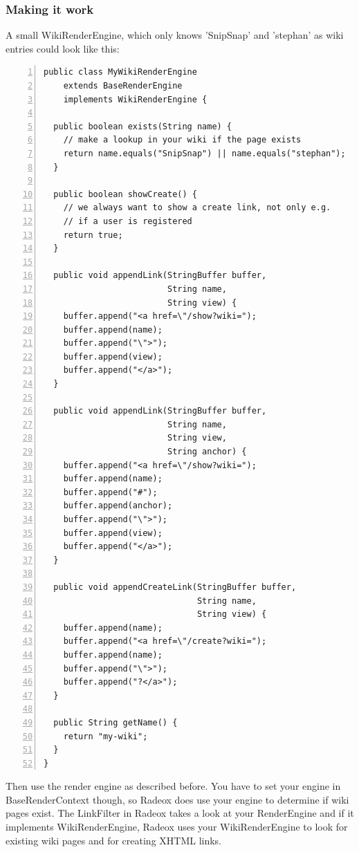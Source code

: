 \documentclass[a4paper,pdftex]{article}
\begin{document}
\subsubsection{Making it work}

A small WikiRenderEngine, which only knows 'SnipSnap' and 'stephan' as wiki entries could look like this:

\begin{Verbatim}[gobble=0,frame=single,numbers=left,fontsize=\small]
public class MyWikiRenderEngine
    extends BaseRenderEngine
    implements WikiRenderEngine {

  public boolean exists(String name) {
    // make a lookup in your wiki if the page exists
    return name.equals("SnipSnap") || name.equals("stephan");
  }

  public boolean showCreate() {
    // we always want to show a create link, not only e.g.
    // if a user is registered
    return true;
  }

  public void appendLink(StringBuffer buffer,
                         String name,
                         String view) {
    buffer.append("<a href=\"/show?wiki=");
    buffer.append(name);
    buffer.append("\">");
    buffer.append(view);
    buffer.append("</a>");
  }

  public void appendLink(StringBuffer buffer,
                         String name,
                         String view,
                         String anchor) {
    buffer.append("<a href=\"/show?wiki=");
    buffer.append(name);
    buffer.append("#");
    buffer.append(anchor);
    buffer.append("\">");
    buffer.append(view);
    buffer.append("</a>");
  }

  public void appendCreateLink(StringBuffer buffer,
                               String name,
                               String view) {
    buffer.append(name);
    buffer.append("<a href=\"/create?wiki=");
    buffer.append(name);
    buffer.append("\">");
    buffer.append("?</a>");
  }

  public String getName() {
    return "my-wiki";
  }
}
\end{Verbatim}

Then use the render engine as described before. You have to set your engine in BaseRenderContext though, 
so Radeox does use your engine to determine if wiki pages exist. The LinkFilter in Radeox 
takes a look at your RenderEngine and if it implements WikiRenderEngine, Radeox uses your WikiRenderEngine
to look for existing wiki pages and for creating XHTML links.
\end{document}
